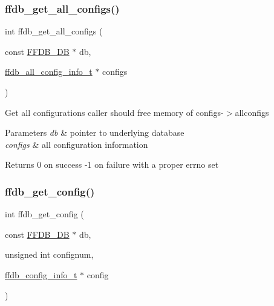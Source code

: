 \subsubsection{\texorpdfstring{ffdb\_get\_all\_configs()}{ffdb\_get\_all\_configs()}}
{\footnotesize\ttfamily int ffdb\+\_\+get\+\_\+all\+\_\+configs (\begin{DoxyParamCaption}\item[{const \mbox{\hyperlink{adat-devel_2other__libs_2filedb_2filehash_2ffdb__db_8h_a0b27b956926453a7a8141ea8e10f0df8}{F\+F\+D\+B\+\_\+\+DB}} $\ast$}]{db,  }\item[{\mbox{\hyperlink{adat-devel_2other__libs_2filedb_2filehash_2ffdb__db_8h_afc17234e7cd387e11de55b92df6bb0e5}{ffdb\+\_\+all\+\_\+config\+\_\+info\+\_\+t}} $\ast$}]{configs }\end{DoxyParamCaption})}

Get all configurations caller should free memory of configs-\/$>$allconfigs


\begin{DoxyParams}{Parameters}
{\em db} & pointer to underlying database \\
\hline
{\em configs} & all configuration information\\
\hline
\end{DoxyParams}
\begin{DoxyReturn}{Returns}
0 on success -\/1 on failure with a proper errno set 
\end{DoxyReturn}
\mbox{\label{adat-devel_2other__libs_2filedb_2filehash_2ffdb__hash_8c_a02bc33564d34e6fe08e28f3bad609cfb}} 
\subsubsection{\texorpdfstring{ffdb\_get\_config()}{ffdb\_get\_config()}}
{\footnotesize\ttfamily int ffdb\+\_\+get\+\_\+config (\begin{DoxyParamCaption}\item[{const \mbox{\hyperlink{adat-devel_2other__libs_2filedb_2filehash_2ffdb__db_8h_a0b27b956926453a7a8141ea8e10f0df8}{F\+F\+D\+B\+\_\+\+DB}} $\ast$}]{db,  }\item[{unsigned int}]{confignum,  }\item[{\mbox{\hyperlink{adat-devel_2other__libs_2filedb_2filehash_2ffdb__db_8h_acc961fbd2faf6a849a1620309100fda1}{ffdb\+\_\+config\+\_\+info\+\_\+t}} $\ast$}]{config }\end{DoxyParamCaption})}

